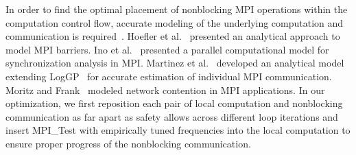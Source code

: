 In order to find the optimal placement of nonblocking MPI operations within the computation control flow,
accurate modeling of the underlying computation and communication is required~\cite{brightwell:ics04}.
Hoefler et al.~\cite{hoefler:icppw05} presented an analytical approach to model MPI barriers.
Ino et al.~\cite{ino:ppopp2001} presented a parallel computational model for synchronization analysis in MPI.
Martinez et al.~\cite{martinez:ipdps09} developed an analytical model extending LogGP~\cite{loggp} for accurate estimation of individual MPI communication.
Moritz and Frank~\cite{moritz:tpds01} modeled network contention in MPI applications.
In our optimization,
  we first reposition each pair of local computation and nonblocking communication as far apart as safety allows across different loop iterations and insert MPI\_Test with empirically tuned frequencies into the local computation to ensure proper progress of the nonblocking communication. 


